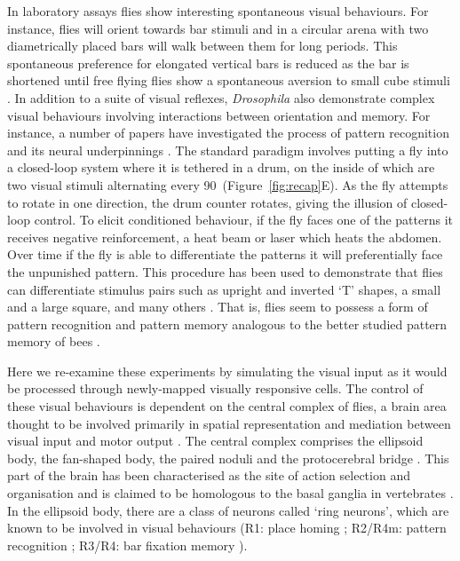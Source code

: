 In laboratory assays flies show interesting spontaneous visual behaviours. For instance, flies will orient towards bar stimuli \cite{Reichardt1969,Gotz1987} and in a circular arena with two diametrically placed bars will walk between them for long periods. This spontaneous preference for elongated vertical bars is reduced as the bar is shortened until free flying flies show a spontaneous aversion to small cube stimuli \cite{Maimon2008}. In addition to a suite of visual reflexes, \emph{Drosophila} also demonstrate complex visual behaviours involving interactions between orientation and memory.
For instance, a number of papers have investigated the process of pattern recognition and its neural underpinnings \cite{Pan2009,Liu2006,Ernst1999}.
The standard paradigm involves putting a fly into a closed-loop system where it is tethered in a drum, on the inside of which are two visual stimuli alternating every 90\degree\ (Figure~\ref{fig:recap}E). As the fly attempts to rotate in one direction, the drum counter rotates, giving the illusion of closed-loop control. To elicit conditioned behaviour, if the fly faces one of the patterns it receives negative reinforcement, a heat beam or laser which heats the abdomen. Over time if the fly is able to differentiate the patterns it will preferentially face the unpunished pattern. This procedure has been used to demonstrate that flies can differentiate stimulus pairs such as upright and inverted `T' shapes, a small and a large square, and many others \cite{Ernst1999}. That is, flies seem to possess a form of pattern recognition and pattern memory analogous to the better studied pattern memory of bees \cite{vonFrisch1914,Giurfa1997,Horridge2009}.

Here we re-examine these experiments by simulating the visual input as it would be processed through newly-mapped visually responsive cells. The control of these visual behaviours is dependent on the central complex of flies, a brain area thought to be involved primarily in spatial representation and mediation between visual input and motor output \cite{Pfeiffer2014}.
The central complex comprises the ellipsoid body, the fan-shaped body, the paired noduli and the protocerebral bridge \cite{Young2010}.
This part of the brain has been characterised as the site of action selection and organisation and is claimed to be homologous to the basal ganglia in vertebrates \cite{Strausfeld2013}.
In the ellipsoid body, there are a class of neurons called `ring neurons', which are known to be involved in visual behaviours (R1: place homing \cite{Ofstad2011,Sitaraman2010,Sitaraman2008}; R2/R4m: pattern recognition \cite{Pan2009,Liu2006,Ernst1999}; R3/R4: bar fixation memory \cite{Neuser2008}).

